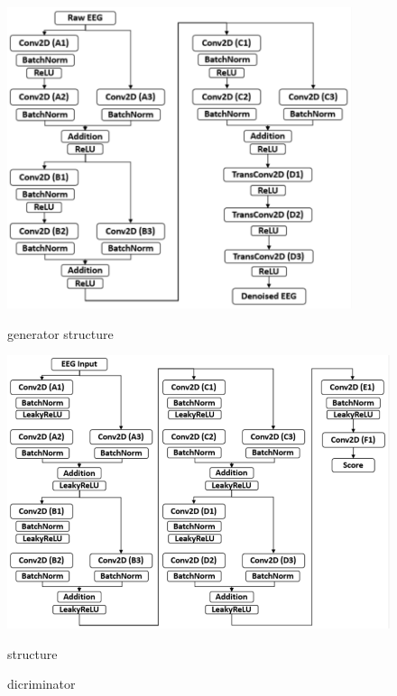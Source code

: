\documentclass[a4paper]{sapthesis}
\begin{document}
\begin{figure}[h]
  \begin{minipage}
    {0.5\textwidth}
    \centering
    \includegraphics[width=0.9\textwidth]{images/generator_structure.png}
    \caption{generator structure}
    \label{fig:generator_structure}
  \end{minipage}
  \begin{minipage}
    {0.5\textwidth}
    \centering
    \includegraphics[width=1\textwidth]{images/discriminator_structure.png}
    \caption{dicriminator} structure
    \label{fig:discriminator_structure}
  \end{minipage}
\label{fig:gan_structure}
\end{figure}
\end{document}
